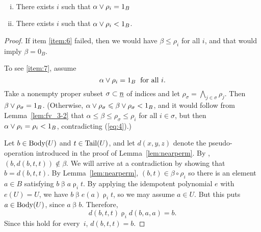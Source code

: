 \begin{lemma}\
  \label{lem:fv_3-3}
  \begin{enumerate}[(i)]
    \item \label{item:6} There exists $i$
      such that $\alpha \join \rho_i = 1_B$
    \item \label{item:7} There exists $i$ such that  
      $\alpha \join \rho_i < 1_B$.
  \end{enumerate}
\end{lemma}
\begin{proof}
If item \eqref{item:6} failed, then we would 
have $\beta \leq \rho_i$ for all $i$, and that
would imply $\beta = 0_B$.
  
To see \eqref{item:7}, assume
\begin{equation} \label{eq:4}
\alpha \join \rho_i = 1_B \; \text{ for all $i$.}
\end{equation}
Take a nonempty proper subset $\sigma \subset \underline{n}$ of indices and let 
$\rho_\sigma = \bigwedge_{j\in \sigma} \rho_j$.
Then $\beta \join \rho_\sigma = 1_B$. (Otherwise,
$\alpha \join \rho_\sigma \leq \beta \join \rho_\sigma < 1_B$,
and it would follow from Lemma~\ref{lem:fv_3-2} that
$\alpha \leq \beta \leq \rho_\sigma \leq \rho_i$ for all $i \in \sigma$, 
but then $\alpha \join \rho_i = \rho_i < 1_B$, contradicting (\ref{eq:4}).)




Let $b \in \operatorname{Body}(U)$ and $t \in \operatorname{Tail}(U)$, and let $d(x,y,z)$ 
denote the pseudo-\malcev operation introduced in the proof of Lemma~\ref{lem:nearperm}. By
\cite[Lemma~4.25]{HM:1988}, $(b, d(b,t,t)) \notin \beta$.
We will arrive at a contradiction by showing that 
$b = d(b,t,t)$. By Lemma~\ref{lem:nearperm}, 
$(b,t) \in \beta \circ \rho_i$ so
there is an element $a \in B$ satisfying 
$b\mathrel\beta a \mathrel\rho_i t$. By applying the idempotent
polynomial $e$ with $e(U) = U$, we have 
$b\mathrel\beta e(a) \mathrel\rho_i t$, so we may
assume $a \in U$. But this puts $a \in \operatorname{Body}(U)$,
since $a\mathrel \beta b$. Therefore, 
\[
d(b,t,t) \mathrel\rho_i d(b,a,a) = b.
\]
Since this hold for every~$i$, $d(b,t,t) = b$.
\end{proof}


